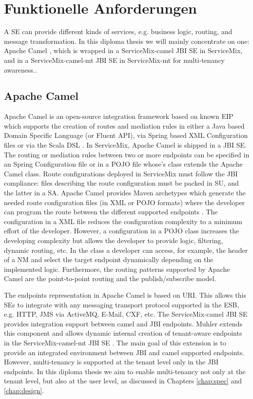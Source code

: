 \section{Funktionelle Anforderungen}
\label{sec:FunktionelleAnforderungen}  

A \ac{SE} can provide different kinds of services, e.g. business logic, routing, and message transformation. In this diploma thesis we will mainly concentrate on one: Apache Camel \cite{Camel2011}, which is wrapped in a ServiceMix-camel \ac{JBI} \ac{SE} in ServiceMix, and in a ServiceMix-camel-mt \ac{JBI} \ac{SE} in ServiceMix-mt  for multi-tenancy awareness..

\subsection{Apache Camel}

Apache Camel is an open-source integration framework based on known \ac{EIP} which supports the creation of routes and mediation rules in either a Java based Domain Specific Language (or Fluent API), via Spring based XML Configuration files or via the Scala DSL \cite{Camel2011}. In ServiceMix, Apache Camel is shipped in a \ac{JBI} \ac{SE}. The routing or mediation rules between two or more endpoints can be specified in an Spring Configuration file or in a \ac{POJO} file whose's class extends the Apache Camel  class. Route configurations deployed in ServiceMix must follow the \ac{JBI} compliance: files describing the route configuration must be packed in \ac{SU}, and the latter in a \ac{SA}. Apache Camel provides Maven archetypes which generate the needed route configuration files (in \ac{XML} or \ac{POJO} formats) where the developer can program the route between the different supported endpoints \cite{MAVEN}. The configuration in a \ac{XML} file reduces the configuration complexity to a minimum effort of the developer. However, a configuration in a \ac{POJO} class increases the developing complexity but allows the developer to provide logic, filtering, dynamic routing, etc. In the  class a developer can access, for example, the header of a \ac{NM} and select the target endpoint dynamically depending on the implemented logic. Furthermore, the routing patterns supported by Apache Camel are the point-to-point routing and the publish/subscribe model. 

The endpoints representation in Apache Camel is based on \ac{URI}. This allows this \ac{SE}s to integrate with any messaging transport protocol supported in the \ac{ESB}, e.g. \ac{HTTP}, \ac{JMS} via ActiveMQ, E-Mail, CXF, etc. The ServiceMix-camel \ac{JBI} \ac{SE} provides integration support between camel and \ac{JBI} endpoints. Muhler extends this component and allows dynamic internal creation of tenant-aware endpoints in the ServiceMix-camel-mt \ac{JBI} \ac{SE} \cite{Muhler2012}. The main goal of this extension is to provide an integrated environment between \ac{JBI} and camel supported endpoints. However, multi-tenancy is supported at the tenant level only in the \ac{JBI} endpoints. In this diploma thesis we aim to enable multi-tenancy not only at the tenant level, but also at the user level, as discussed in Chapters \ref{chap:spec} and \ref{chap:design}.


